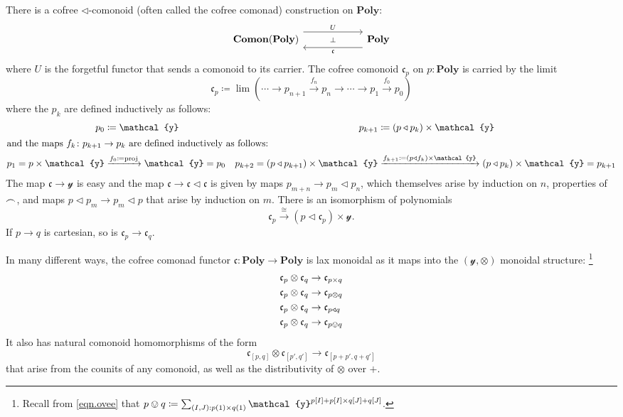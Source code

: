 \documentclass[11pt, one side, article]{memoir}
\theoremstyle{definition}
\theoremstyle{plain}
\newcommand{\Cat}[1]{\mathbf{#1}}%
\newcommand{\To}[2][]{\xrightarrow[#1]{#2}}
\newcommand{\tn}[1]{\textnormal{#1}}
\newcommand{\nn}{\mathbb{N}}
\newcommand{\smset}{\Cat{Set}}
\newcommand{\yon}{\mathcal{y}}
\newcommand{\poly}{\Cat{Poly}}
\newcommand{\0}{\textsf{0}}
\newcommand{\1}{\tn{\textsf{1}}}
\newcommand{\tri}{\mathbin{\triangleleft}}
\newcommand{\cofree}{\mathfrak{c}}
\newcommand{\indexcoclscale}[1]{\scalebox{.7}{#1}}
\newcommand{\cocl}[1]{
	\scriptsize\overset{\,\indexcoclscale{$#1$}}{\frown}\normalsize
}
\begin{document}
There is a cofree $\tri$-comonoid (often called the cofree comonad) construction on $\poly$:
\begin{equation}\label{eqn.cofree}
\begin{tikzcd}[column sep=60pt]
	\Cat{Comon}(\poly)
  	\ar[from=r, shift left=8pt, "\cofree"]
		\ar[from=r, phantom, "\scriptstyle\bot"]
  	&
	\poly
		\ar[from=l, shift right=-8pt, "U"]
\end{tikzcd}
\end{equation}
where $U$ is the forgetful functor that sends a comonoid to its carrier. The cofree comonoid $\cofree_p$ on $p:\poly$ is carried by the limit
\begin{equation}
\cofree_p\coloneqq\lim(\cdots\to p_{n+1}\To{f_n} p_n\to\cdots\to p_1\To{f_0} p_0)
\end{equation}
where the $p_k$ are defined inductively as follows:
\begin{align}
	p_0&\coloneqq\yon&p_{k+1}&\coloneqq (p\tri p_k)\times\yon\\
\intertext{and the maps $f_k\colon p_{k+1}\to p_k$ are defined inductively as follows:}
	p_1=p\times\yon&\To{f_0\coloneqq\tn{proj}}\yon=p_0&p_{k+2}=(p\tri p_{k+1})\times\yon&\To{f_{k+1}\coloneqq(p\tri f_k)\times\yon}(p\tri p_{k})\times\yon=p_{k+1}
\end{align}
The map $\cofree\to\yon$ is easy and the map $\cofree\to\cofree\tri\cofree$ is given by maps $p_{m+n}\to p_m\tri p_n$, which themselves arise by induction on $n$, properties of $\cocl{}$, and maps $p\tri p_m\to p_m\tri p$ that  arise by induction on $m$. There is an isomorphism of polynomials
\begin{equation}\label{eqn.cofree_iso}
	\cofree_p\To{\cong} (p\tri\cofree_p)\times\yon.
\end{equation}
If $p\to q$ is cartesian, so is $\cofree_p\to\cofree_q$.

In many different ways, the cofree comonad functor $\cofree\colon\poly\to\poly$ is lax monoidal as it maps into the $(\yon,\otimes)$ monoidal structure:%
\footnote{Recall from \eqref{eqn.ovee} that $p\ovee q\coloneqq \sum_{(I,J): p(1)\times q(1)}\yon^{p[I]+p[I]\times q[J]+q[J]}$.}
\begin{align}
  \cofree_p\otimes\cofree_q&\to\cofree_{p\times q}\\
  \label{cofree_lax_monoidal}
  \cofree_p\otimes\cofree_q&\to\cofree_{p\otimes q}\\
  \cofree_p\otimes\cofree_q&\to\cofree_{p\tri q}\\
	\cofree_p\otimes\cofree_q&\to\cofree_{p\ovee q}  
\end{align}
It also has natural comonoid homomorphisms of the form
\begin{equation}
	\cofree_{[p,q]}\otimes\cofree_{[p',q']}\to\cofree_{[p+p',q+q']}
\end{equation}
that arise from the counits of any comonoid, as well as the distributivity of $\otimes$ over $+$.
\end{document}

